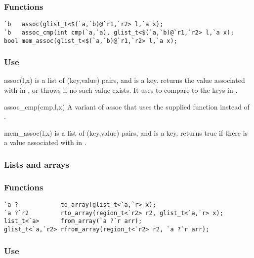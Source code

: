 \subsubsection*{Functions}
\begin{verbatim}
`b   assoc(glist_t<$(`a,`b)@`r1,`r2> l,`a x);
`b   assoc_cmp(int cmp(`a,`a), glist_t<$(`a,`b)@`r1,`r2> l,`a x);
bool mem_assoc(glist_t<$(`a,`b)@`r1,`r2> l,`a x);
\end{verbatim} %

\subsubsection*{Use}

\begin{defun}{assoc}{(l,x)}
 is a list of (key,value) pairs, and  is a key.
 returns the value associated with  in , or
throws  if no such value exists.  It uses
\code{==} to compare  to the keys in .
\end{defun}

\begin{defun}{assoc_cmp}{(cmp,l,x)}
A variant of assoc that uses the supplied  function instead
of \code{==}.
\end{defun}

\begin{defun}{mem_assoc}{(l,x)}
 is a list of (key,value) pairs, and  is a key.
 returns true if there is a value associated with
 in .
\end{defun}


\subsubsection*{Lists and arrays}
\subsubsection*{Functions}
\begin{verbatim}
`a ?            to_array(glist_t<`a,`r> x);
`a ?`r2         rto_array(region_t<`r2> r2, glist_t<`a,`r> x);
list_t<`a>      from_array(`a ?`r arr);
glist_t<`a,`r2> rfrom_array(region_t<`r2> r2, `a ?`r arr);
\end{verbatim}

\subsubsection*{Use}

